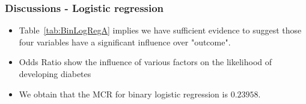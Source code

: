 \documentclass{beamer}
\begin{document}
\begin{frame}
    \frametitle{Discussions - Logistic regression}
    \begin{itemize}
        \item Table~\ref{tab:BinLogRegA} implies we have sufficient evidence to suggest those four variables have a significant influence over "outcome".
    \end{itemize}
    \begin{itemize}
        \item Odds Ratio show the influence of various factors on the likelihood of developing diabetes
    \end{itemize}
    \begin{table}
        \centering
        \caption{Binary Logistic Regression Reduced Model Output with Odds Ratio}
        \label{tab:BinLogRegA}
    \end{table}
    \begin{itemize}
        \item We obtain that the MCR for binary logistic regression is $0.23958$.
    \end{itemize}
\end{frame}
\end{document}
